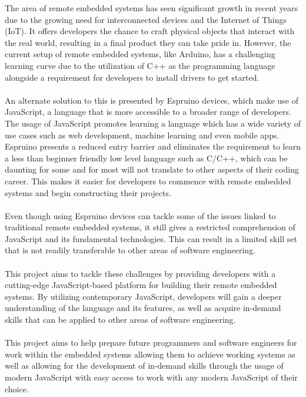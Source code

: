 \documentclass{l4proj}
\begin{document}
\text 
The area of remote embedded systems has seen significant growth in recent years due to the growing need for interconnected devices and the Internet of Things (IoT). It offers developers the chance to craft physical objects that interact with the real world, resulting in a final product they can take pride in. However, the current setup of remote embedded systems, like Arduino, has a challenging learning curve due to the utilization of C++ as the programming language alongside a requirement for developers to install drivers to get started.
\\ \\
An alternate solution to this is presented by Espruino devices, which make use of JavaScript, a language that is more accessible to a broader range of developers. The usage of JavaScript promotes learning a language which has a wide variety of use cases such as web development, machine learning and even mobile apps. Espruino presents a reduced entry barrier and eliminates the requirement to learn a less than beginner friendly low level language such as C/C++, which can be daunting for some and for most will not translate to other aspects of their coding career. This makes it easier for developers to commence with remote embedded systems and begin constructing their projects.
\\ \\
Even though using Espruino devices can tackle some of the issues linked to traditional remote embedded systems, it still gives a restricted comprehension of JavaScript and its fundamental technologies. This can result in a limited skill set that is not readily transferable to other areas of software engineering.
\\ \\
This project aims to tackle these challenges by providing developers with a cutting-edge JavaScript-based platform for building their remote embedded systems. By utilizing contemporary JavaScript, developers will gain a deeper understanding of the language and its features, as well as acquire in-demand skills that can be applied to other areas of software engineering.
\\ \\
This project aims to help prepare future programmers and software engineers for work within the embedded systems allowing them to achieve working systems as well as allowing for the development of in-demand skills through the usage of modern JavaScript with easy access to work with any modern JavaScript of their choice.
\end{document}

